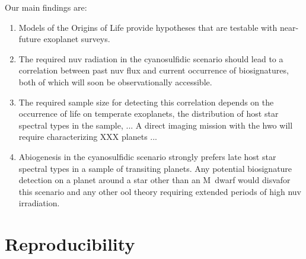 \documentclass[modern,linenumbers]{aastex631}
\begin{document}
Our main findings are:
\begin{enumerate}
    \item Models of the Origins of Life provide hypotheses that are testable with near-future exoplanet surveys.
    \item The required \gls{nuv} radiation in the cyanosulfidic scenario should lead to a correlation between past \gls{nuv} flux and current occurrence of biosignatures, both of which will soon be observationally accessible.
    \item The required sample size for detecting this correlation depends on the occurrence of life on temperate exoplanets, the distribution of host star spectral types in the sample, ...
        A direct imaging mission with the \gls{hwo} will require characterizing XXX planets ...
    \item Abiogenesis in the cyanosulfidic scenario strongly prefers late host star spectral types in a sample of transiting planets. Any potential biosignature detection on a planet around a star other than an M~dwarf would disvafor this scenario and any other \gls{ool} theory requiring extended periods of high \gls{nuv} irradiation.
\end{enumerate}

%

\section*{Reproducibility}


\end{document}
